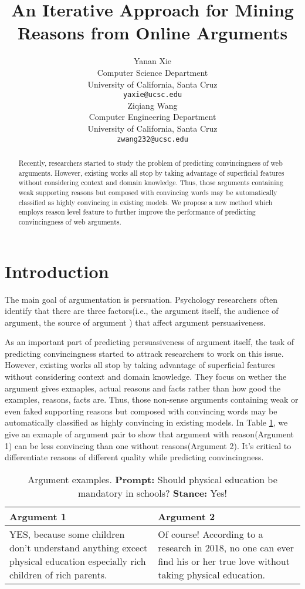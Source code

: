 \documentclass[11pt,a4paper]{article}
\title{An Iterative Approach for Mining Reasons from Online Arguments}
\author{Yanan Xie \\
Computer Science Department\\
University of California, Santa Cruz\\
  {\tt yaxie@ucsc.edu} \\\And
  Ziqiang Wang \\
Computer Engineering Department\\
University of California, Santa Cruz\\
  {\tt zwang232@ucsc.edu} \\}
\date{}
\begin{document}
\maketitle
\begin{abstract}
Recently, researchers started to study the problem of predicting convincingness of web arguments. However, existing works all stop by taking advantage of superficial features without considering context and domain knowledge. Thus, those arguments containing weak supporting reasons but composed with convincing words may be automatically classified as highly convincing in existing models. We propose a new method which employs reason level feature to further improve the performance of predicting convincingness of web arguments.
\end{abstract}

\section{Introduction}

The main goal of argumentation is persuation\cite{nettel2012persuasive, mercier2011humans, blair2012argumentation}. Psychology researchers often identify that there are three factors(i.e., the argument itself, the audience of argument, the source of argument ) that affect argument persuasiveness\cite{petty1986elaboration}. 

As an important part of predicting persuasiveness of argument itself, the task of predicting convincingness started to attrack researchers to work on this issue\cite{habernal2016argument}. However, existing works all stop by taking advantage of superficial features without considering context and domain knowledge. They focus on wether the argument gives exmaples, actual reasons and facts rather than how good the examples, reasons, facts are. Thus, those non-sense arguments containing weak or even faked supporting reasons but composed with convincing words may be automatically classified as highly convincing in existing models. In Table \ref{table:argumentexamples}, we give an exmaple of argument pair to show that argument with reason(Argument 1) can be less convincing than one without reasons(Argument 2). It's critical to differentiate reasons of different quality while predicting convincingness. 

\begin{table}[h]
\begin{tabular}{| p{3.5cm} | p{3.5cm} | }
\hline
{\bf Argument 1} & {\bf Argument 2} \\
\hline
YES, because some children don’t understand anything excect physical education especially rich children of rich parents. & Of course!  According to a research in 2018, no one can ever find his or her true love without taking physical education.\\
\hline

\end{tabular}
\caption{Argument examples. {\bf Prompt:} Should physical education be mandatory in schools? {\bf Stance:} Yes!} 
\label{table:argumentexamples}
\end{table}
\end{document}
